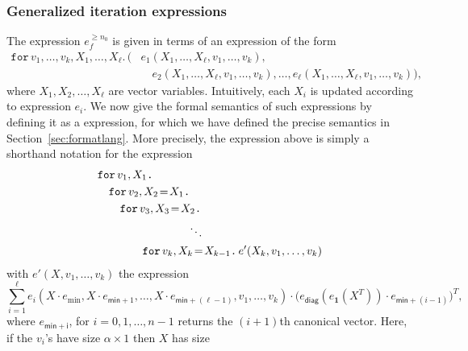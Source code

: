 \subsubsection{Generalized iteration expressions}\label{subsubsec:generalloop}
The expression $e_f^{\geq n_0}$ is given in terms of an expression of the form 
\begin{align*}
    \texttt{for}\, v_1,\ldots, v_k,X_1,\ldots, X_\ell \texttt{.}\, \Big( &e_1(X_1,\ldots,X_\ell,v_1,\ldots, v_k), \\
    &\hspace{1em}e_2(X_1,\ldots, X_\ell,v_1,\ldots, v_k), \ldots, e_\ell(X_1,\ldots,X_\ell,v_1,\ldots, v_k) \Big),
\end{align*}
where $X_1,X_2,\ldots,X_\ell$ are vector variables. Intuitively, each $X_i$ is updated according to expression $e_i$.
We now give the formal semantics of such expressions by defining it as a \langfor expression, for which we have defined the precise semantics in Section~\ref{sec:formatlang}.
More precisely, the expression above is simply a shorthand notation for the \langfor expression
\begin{align*}
  &\ffor{v_1}{X_1}{} \\
  &\hspace{1em}\initf{X_1}{v_2}{X_2}{} \\
  &\hspace{2em}\initf{X_2}{v_3}{X_3}{} \\
  &\hspace{8em}\ddots \\
  &\hspace{4em}\initf{X_{k-1}}{v_k}{X_k}{ e'(X_k,v_1,\ldots, v_k)}
\end{align*}
with $e'(X,v_1,\ldots,v_k)$ the expression
$$
\sum_{i=1}^{\ell} e_i(X\cdot e_{\min}, X\cdot e_{\mathsf{min}+1},\ldots,X\cdot e_{\mathsf{min}+(\ell-1)},v_1,\ldots,v_k)\cdot \bigl(
e_{\mathsf{diag}}(e_{\mathbf{1}}(X^T))\cdot e_{\mathsf{min}+(i-1)}\bigr)^T,
%
$$
where $e_{\mathsf{min}+\mathsf{i}}$, for $i=0,1,\ldots,n-1$ returns the $(i+1)$th canonical vector. Here, if the $v_i$'s have
size $\alpha\times 1$ then $X$ has size
